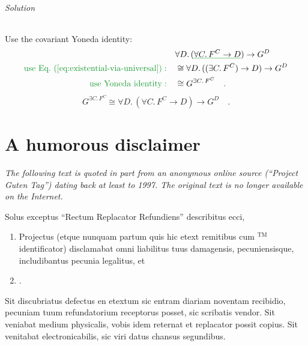 \subparagraph{Solution }

Use the covariant Yoneda identity:
\begin{align*}
 & \forall D.\,(\gunderline{\forall C.\,F^{C}\rightarrow D})\rightarrow G^{D}\\
{\color{greenunder}\text{use Eq.~(\ref{eq:existential-via-universal})}:}\quad & \cong\forall D.\,((\exists C.\,F^{C})\rightarrow D)\rightarrow G^{D}\\
{\color{greenunder}\text{use Yoneda identity}:}\quad & \cong G^{\exists C.\,F^{C}}\quad.
\end{align*}
\[
G^{\exists C.\,F^{C}}\cong\forall D.\,(\forall C.\,F^{C}\rightarrow D)\rightarrow G^{D}\quad.
\]


\chapter{A humorous disclaimer}

\emph{The following text is quoted in part from an anonymous
online source (\textsf{``}Project Guten Tag\textsf{''}) dating back at least to 1997.
The original text is no longer available on the Internet.}

\medskip{}


Solus exceptus \textsf{``}Rectum Replacator Refundiens\textsf{''} describitus ecci,
\begin{enumerate}
\item Projectus (etque nunquam partum quis hic etext remitibus cum $^{\text{TM}}$ identificator) disclamabat omni liabilitus
tuus damagensis, pecuniensisque, includibantus pecunia legalitus,
et 
\item {}. 
\end{enumerate}
Sit discubriatus defectus en etextum sic entram diariam noventam recibidio,
pecuniam tuum refundatorium receptorus posset, sic scribatis vendor.
Sit veniabat medium physicalis, vobis idem reternat et replacator
possit copius. Sit venitabat electronicabilis, sic viri datus chansus
segundibus. 


